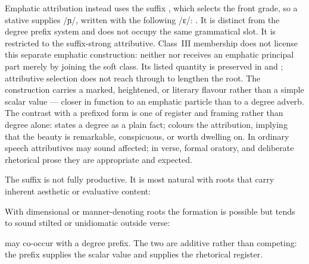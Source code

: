 Emphatic attribution instead uses the suffix , which selects the front grade, so a stative
 supplies /ɲ/, written  with the following /ɛ/: .
It is distinct from the degree prefix system and does not occupy the same
grammatical slot. It is restricted to the suffix-strong  attributive.
Class~III membership does not license this separate emphatic construction:
neither  nor  receives an emphatic principal
part merely by joining the soft class. Its listed quantity is preserved in
 and ; attributive selection does not reach through
 to lengthen the root. The construction carries a marked, heightened, or literary flavour rather than a simple
scalar value --- closer in function to an emphatic particle than to a degree
adverb. The contrast with a prefixed form is one of register and framing
rather than degree alone:  states a degree as a plain fact;
 colours the attribution, implying that the beauty is
remarkable, conspicuous, or worth dwelling on. In ordinary speech
 attributives may sound affected; in verse, formal oratory, and
deliberate rhetorical prose they are appropriate and expected.

The suffix is not fully productive. It is most natural with roots that carry
inherent aesthetic or evaluative content:

\pex
\a {}  
\a {}  
\xe

\noindent With dimensional or manner-denoting roots the formation is possible
but tends to sound stilted or unidiomatic outside verse:

\pex
\a {}  
\a {}  
\xe

 may co-occur with a degree prefix. The two are additive rather
than competing: the prefix supplies the scalar value and  supplies
the rhetorical register.

\pex
\a {}  
\a {}  
\a {}  
\xe

